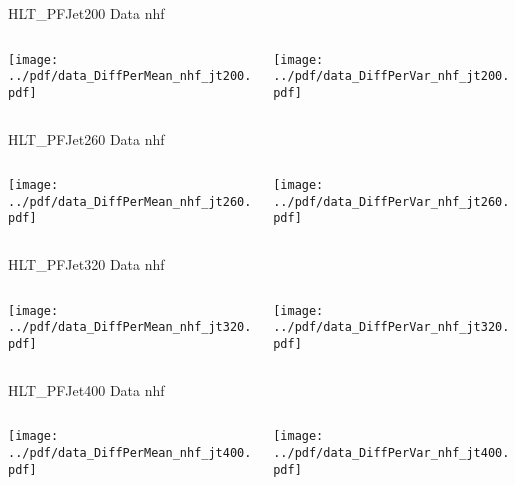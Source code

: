 \documentclass[9pt]{beamer}
\begin{document}
\begin{frame}[t]{HLT\_PFJet200 Data nhf}
\begin{columns}[T]
  \begin{column}{.5\textwidth}
  \texttt{[image: ../pdf/data\_DiffPerMean\_nhf\_jt200.pdf]}
  \end{column}
  \begin{column}{.5\textwidth}
  \texttt{[image: ../pdf/data\_DiffPerVar\_nhf\_jt200.pdf]}
  \end{column}
\end{columns}
\end{frame}

\begin{frame}[t]{HLT\_PFJet260 Data nhf}
\begin{columns}[T]
  \begin{column}{.5\textwidth}
  \texttt{[image: ../pdf/data\_DiffPerMean\_nhf\_jt260.pdf]}
  \end{column}
  \begin{column}{.5\textwidth}
  \texttt{[image: ../pdf/data\_DiffPerVar\_nhf\_jt260.pdf]}
  \end{column}
\end{columns}
\end{frame}

\begin{frame}[t]{HLT\_PFJet320 Data nhf}
\begin{columns}[T]
  \begin{column}{.5\textwidth}
  \texttt{[image: ../pdf/data\_DiffPerMean\_nhf\_jt320.pdf]}
  \end{column}
  \begin{column}{.5\textwidth}
  \texttt{[image: ../pdf/data\_DiffPerVar\_nhf\_jt320.pdf]}
  \end{column}
\end{columns}
\end{frame}

\begin{frame}[t]{HLT\_PFJet400 Data nhf}
\begin{columns}[T]
  \begin{column}{.5\textwidth}
  \texttt{[image: ../pdf/data\_DiffPerMean\_nhf\_jt400.pdf]}
  \end{column}
  \begin{column}{.5\textwidth}
  \texttt{[image: ../pdf/data\_DiffPerVar\_nhf\_jt400.pdf]}
  \end{column}
\end{columns}
\end{frame}
\end{document}
